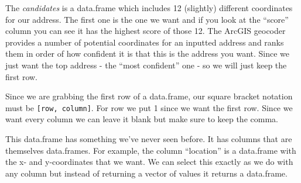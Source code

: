 \documentclass[
  12pt,
]{book}
\newenvironment{Shaded}{\begin{snugshade}}{\end{snugshade}}
\newcommand{\CommentTok}[1]{\textcolor[rgb]{0.56,0.35,0.01}{\textit{#1}}}
\newcommand{\DecValTok}[1]{\textcolor[rgb]{0.00,0.00,0.81}{#1}}
\newcommand{\KeywordTok}[1]{\textcolor[rgb]{0.13,0.29,0.53}{\textbf{#1}}}
\newcommand{\NormalTok}[1]{#1}
\newcommand{\OperatorTok}[1]{\textcolor[rgb]{0.81,0.36,0.00}{\textbf{#1}}}
\newcommand{\StringTok}[1]{\textcolor[rgb]{0.31,0.60,0.02}{#1}}
\begin{document}
The \emph{candidates} is a data.frame which includes 12 (slightly) different coordinates for our address. The first one is the one we want and if you look at the ``score'' column you can see it has the highest score of those 12. The ArcGIS geocoder provides a number of potential coordinates for an inputted address and ranks them in order of how confident it is that this is the address you want. Since we just want the top address - the ``most confident'' one - so we will just keep the first row.

Since we are grabbing the first row of a data.frame, our square bracket notation must be \texttt{{[}row,\ column{]}}. For row we put 1 since we want the first row. Since we want every column we can leave it blank but make sure to keep the comma.

\begin{Shaded}
\end{Shaded}

This data.frame has something we've never seen before. It has columns that are themselves data.frames. For example, the column ``location'' is a data.frame with the x- and y-coordinates that we want. We can select this exactly as we do with any column but instead of returning a vector of values it returns a data.frame.

\begin{Shaded}
\end{Shaded}
\end{document}
